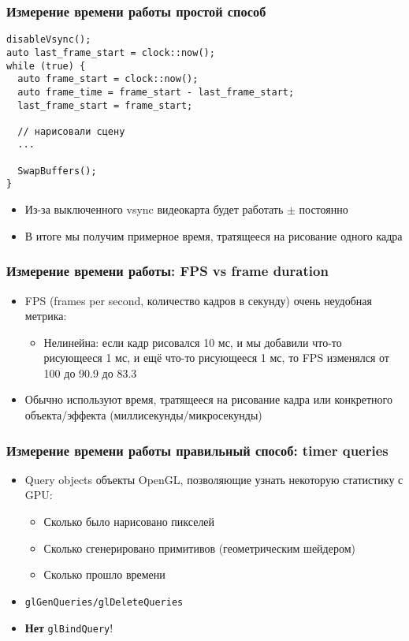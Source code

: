 \documentclass{beamer}
\begin{document}
\begin{frame}[fragile]
\frametitle{Измерение времени работы \textendash{} простой способ}
\begin{verbatim}
disableVsync();
auto last_frame_start = clock::now();
while (true) {
  auto frame_start = clock::now();
  auto frame_time = frame_start - last_frame_start;
  last_frame_start = frame_start;

  // нарисовали сцену
  ...

  SwapBuffers();
}
\end{verbatim}
\pause
\begin{itemize}
\item Из-за выключенного vsync видеокарта будет работать \begin{math}\pm\end{math} постоянно
\pause
\item В итоге мы получим примерное время, тратящееся на рисование одного кадра
\end{itemize}
\end{frame}

\begin{frame}[fragile]
\frametitle{Измерение времени работы: FPS vs frame duration}
\begin{itemize}
\item FPS (frames per second, количество кадров в секунду) \textendash{} очень неудобная метрика:
\pause
\begin{itemize}
\item Нелинейна: если кадр рисовался 10 мс, и мы добавили что-то рисующееся 1 мс, и ещё что-то рисующееся 1 мс, то FPS изменялся от 100 до 90.9 до 83.3
\end{itemize}
\pause
\item Обычно используют время, тратящееся на рисование кадра или конкретного объекта/эффекта (миллисекунды/микросекунды)
\end{itemize}
\end{frame}

\begin{frame}[fragile]
\frametitle{Измерение времени работы \textendash{} правильный способ: timer queries}
\begin{itemize}
\item Query objects \textendash{} объекты OpenGL, позволяющие узнать некоторую статистику с GPU:
\pause
\begin{itemize}
\item Сколько было нарисовано пикселей
\pause
\item Сколько сгенерировано примитивов (геометрическим шейдером)
\pause
\item Сколько прошло времени
\end{itemize}
\pause
\item \verb|glGenQueries/glDeleteQueries|
\pause
\item \textbf{Нет} \verb|glBindQuery|!
\end{itemize}
\end{frame}
\end{document}
